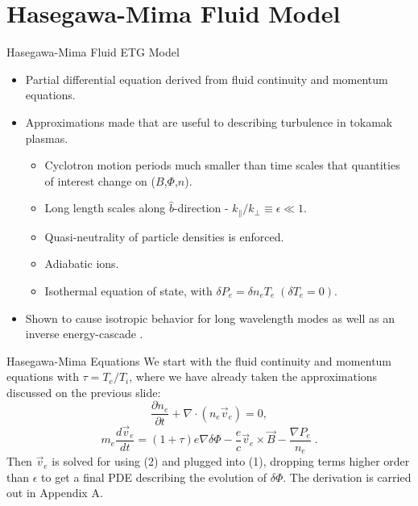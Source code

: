 \documentclass[aspectratio=43]{beamer}
\begin{document}
   \section{Hasegawa-Mima Fluid Model}

   \begin{frame}{Hasegawa-Mima Fluid ETG Model}
      \begin{itemize}
         \item Partial differential equation derived from fluid continuity and momentum equations.
         \item Approximations made that are useful to describing  turbulence in tokamak plasmas.
         \begin{itemize}
            \item Cyclotron motion periods much smaller than time scales that quantities of interest change on ($B$,$\Phi$,$n$).
            \item Long length scales along $\hat{b}$-direction - $k_{\parallel}/k_{\perp}\equiv\epsilon\ll1$.
            \item Quasi-neutrality of particle densities is enforced.
            \item Adiabatic ions.
            \item Isothermal equation of state, with $\delta P_e = \delta n_eT_e\;(\delta T_e=0)$.
         \end{itemize}
         \item Shown to cause isotropic behavior for long wavelength modes as well as an inverse energy-cascade \cite{Hasegawa}.
      \end{itemize}
   \end{frame}

   \begin{frame}{Hasegawa-Mima Equations}
      \quad We start with the fluid continuity and momentum equations with $\tau = T_e/T_i$, where we have already taken the approximations discussed
   on the previous slide:
      \begin{equation}
         \frac{\partial n_e}{\partial t} + \nabla\cdot\left(n_e\vec{v}_e\right) = 0,
      \end{equation}
      \begin{equation}
            m_e\frac{d\vec{v}_e}{dt} = \left(1+\tau\right)e\nabla\delta\Phi - \frac{e}{c}\vec{v}_e\times\vec{B}-\frac{\nabla P_e}{n_e}\;.
      \end{equation}
      \quad Then $\vec{v}_e$ is solved for using (2) and plugged into (1), dropping terms higher order than $\epsilon$
      to get a final PDE describing the evolution of $\delta\Phi$. The derivation is carried out in Appendix A.
   \end{frame}
\end{document}
